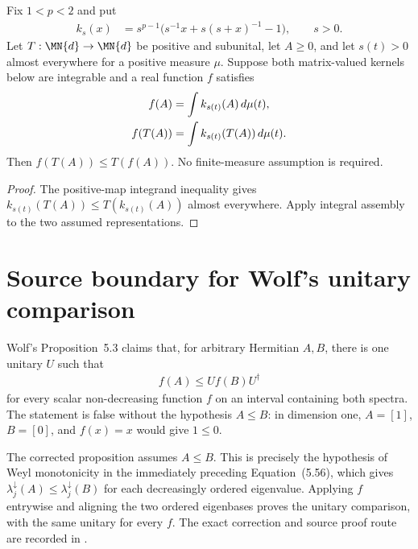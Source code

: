 \begin{theorem}
\label{thm:resolvent-mixture-jensen}
\leanok
{}
Fix $1<p<2$ and put
\begin{align}
 k_s(x)&=s^{p-1}\bigl(s^{-1}x+s(s+x)^{-1}-1\bigr),\qquad s>0.
    \label{eq:ch06_resolvent_mixture_kernel}
\end{align}
Let $T:\MN{d}\to\MN{d}$ be positive and subunital, let $A\geq0$,
and let $s(t)>0$ almost everywhere for a positive measure $\mu$.
Suppose both matrix-valued kernels below are integrable and a real function
$f$ satisfies
\begin{align}
 f(A)&=\int k_{s(t)}(A)\,d\mu(t),\notag\\
 f(T(A))&=\int k_{s(t)}(T(A))\,d\mu(t).
    \label{eq:ch06_resolvent_mixture_representations}
\end{align}
Then $f(T(A))\leq T(f(A))$. No finite-measure assumption is required.
\end{theorem}
\begin{proof}\leanok
{}
The positive-map integrand inequality gives
$k_{s(t)}(T(A))\leq T(k_{s(t)}(A))$ almost everywhere.
Apply integral assembly to the two assumed representations.
\end{proof}

\section{Source boundary for Wolf's unitary comparison}

Wolf's Proposition~5.3 claims that, for arbitrary Hermitian $A,B$, there is
one unitary $U$ such that
\begin{align}
    f(A)\le U f(B)U^\dagger
    \tag{Wolf (5.57)}
\end{align}
for every scalar non-decreasing function $f$ on an interval containing both
spectra.  The statement is false without the hypothesis $A\le B$: in
dimension one, $A=[1]$, $B=[0]$, and $f(x)=x$ would give $1\le0$.

The corrected proposition assumes $A\le B$.  This is precisely the hypothesis
of Weyl monotonicity in the immediately preceding Equation~(5.56), which gives
$\lambda_j^\downarrow(A)\le\lambda_j^\downarrow(B)$ for each decreasingly
ordered eigenvalue.  Applying $f$ entrywise and aligning the two ordered
eigenbases proves the unitary comparison, with the same unitary for every
$f$.  The exact correction and source proof route are recorded in
\cite{gap:wolf_ch5_unitary_comparison_missing_order}.


